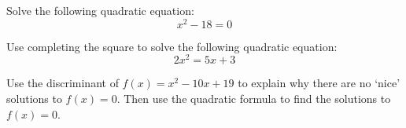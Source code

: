 \documentclass[11pt,letterpaper]{article}
\begin{document}

 Solve the following quadratic equation:
	\[
	x^2 - 18= 0
	\] 



\newpage



 Use completing the square to solve the following quadratic equation:
	\[
	2x^2= 5x + 3
	\]



\newpage



 Use the discriminant of $f(x)= x^2 - 10x + 19$ to explain why there are no `nice' solutions to $f(x)= 0$. Then use the quadratic formula to find the solutions to $f(x)= 0$. 
\end{document}
